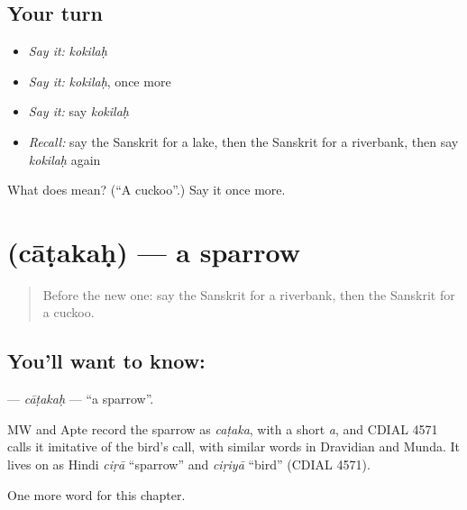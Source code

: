 \subsection*{Your turn}
\begin{itemize}
\raggedright
  \item \emph{Say it:} \emph{kokilaḥ}
  \item \emph{Say it:} \emph{kokilaḥ}, once more
  \item \emph{Say it:} say \emph{kokilaḥ}
  \item \emph{Recall:} say the Sanskrit for a lake, then the Sanskrit for a riverbank, then say \emph{kokilaḥ} again
\end{itemize}

\begin{tcolorbox}[breakable,colback=teal!4,colframe=teal!35!black,title={Before you move on}]
What does  mean? (\textquotedblleft{}A cuckoo\textquotedblright{}.) Say it once more.
\end{tcolorbox}
\section[\texorpdfstring{\sk{चाटकः} (cāṭakaḥ)}{चाटकः (cāṭakaḥ)}]{ (cāṭakaḥ) — a sparrow}

\label{lesson:SA-C124-catakah}



\begin{quote}
Before the new one: say the Sanskrit for a riverbank, then the Sanskrit for a cuckoo.
\end{quote}

\subsection*{You'll want to know: }
\textbf{} — \emph{cāṭakaḥ} — \textquotedblleft{}a sparrow\textquotedblright{}.

\begin{cousinweb}
MW and Apte record the sparrow as \emph{caṭaka}, with a short \emph{a}, and CDIAL 4571 calls it imitative of the bird's call, with similar words in Dravidian and Munda. It lives on as Hindi \emph{ciṛā} \textquotedblleft{}sparrow\textquotedblright{} and \emph{ciṛiyā} \textquotedblleft{}bird\textquotedblright{} (CDIAL 4571).
\end{cousinweb}

\begin{grammarlens}[title={What you've built}]
One more word for this chapter.
\end{grammarlens}

